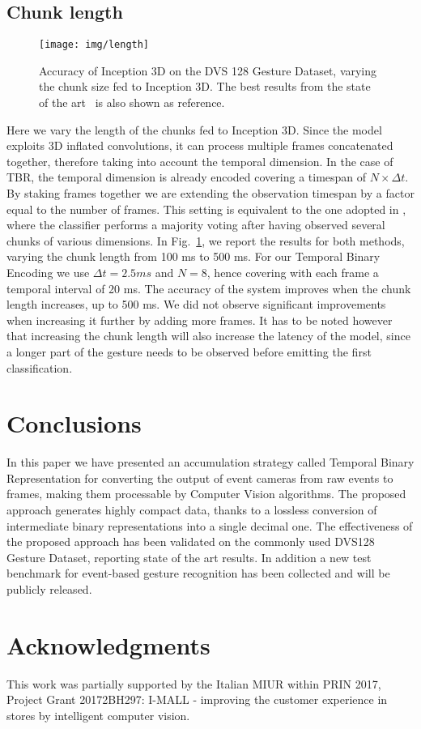 \documentclass[a4paper,conference]{IEEEtran}
\begin{document}
\subsection{Chunk length}
\begin{figure}[t]
	\centering
	\texttt{[image: img/length]}
	\caption{Accuracy of Inception 3D on the DVS 128 Gesture Dataset, varying the chunk size fed to Inception 3D. The best results from the state of the art~\cite{ghosh2019spatiotemporal} is also shown as reference.}
	\label{fig:chunk}
\end{figure}
Here we vary the length of the chunks fed to Inception 3D. Since the model exploits 3D inflated convolutions, it can process multiple frames concatenated together, therefore taking into account the temporal dimension. In the case of TBR, the temporal dimension is already encoded covering a timespan of $N\times\Delta t$.
By staking frames together we are extending the observation timespan by a factor equal to the number of frames. This setting is equivalent to the one adopted in \cite{ghosh2019spatiotemporal}, where the classifier performs a majority voting after having observed several chunks of various dimensions.
In Fig.~\ref{fig:chunk}, we report the results for both methods, varying the chunk length from 100 ms to 500 ms. For our Temporal Binary Encoding we use $\Delta t=2.5 ms$ and $N=8$, hence covering with each frame a temporal interval of 20 ms.
The accuracy of the system improves when the chunk length increases, up to 500 ms. We did not observe significant improvements when increasing it further by adding more frames. It has to be noted however that increasing the chunk length will also increase the latency of the model, since a longer part of the gesture needs to be observed before emitting the first classification.

\section{Conclusions}
\label{sec:conclusions}
In this paper we have presented an accumulation strategy called Temporal Binary Representation for converting the output of event cameras from raw events to frames, making them processable by Computer Vision algorithms. The proposed approach generates highly compact data, thanks to a lossless conversion of intermediate binary representations into a single decimal one. The effectiveness of the proposed approach has been validated on the commonly used DVS128 Gesture Dataset, reporting state of the art results. In addition a new test benchmark for event-based gesture recognition has been collected and will be publicly released.

\section*{Acknowledgments}
This work was partially supported by the Italian MIUR within PRIN 2017, Project Grant 20172BH297: I-MALL - improving the customer experience in stores by intelligent computer vision.










\end{document}
